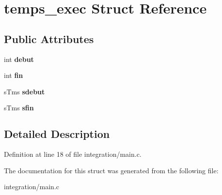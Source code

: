 \hypertarget{structtemps__exec}{
\section{temps\_\-exec Struct Reference}
\label{structtemps__exec}
}
\subsection*{Public Attributes}
\begin{DoxyCompactItemize}
\item 
\hypertarget{structtemps__exec_a392edd3b60bf1b61032e27528946f8d5}{
int {\bfseries debut}}
\label{structtemps__exec_a392edd3b60bf1b61032e27528946f8d5}

\item 
\hypertarget{structtemps__exec_a33e178c93b24aa4a25f96a4f3c8290fc}{
int {\bfseries fin}}
\label{structtemps__exec_a33e178c93b24aa4a25f96a4f3c8290fc}

\item 
\hypertarget{structtemps__exec_ab16cffe01bb5bacabda95ee61505f827}{
sTms {\bfseries sdebut}}
\label{structtemps__exec_ab16cffe01bb5bacabda95ee61505f827}

\item 
\hypertarget{structtemps__exec_acfe99338924b71c95acb16fe7ce30a33}{
sTms {\bfseries sfin}}
\label{structtemps__exec_acfe99338924b71c95acb16fe7ce30a33}

\end{DoxyCompactItemize}


\subsection{Detailed Description}


Definition at line 18 of file integration/main.c.



The documentation for this struct was generated from the following file:\begin{DoxyCompactItemize}
\item 
integration/main.c\end{DoxyCompactItemize}
